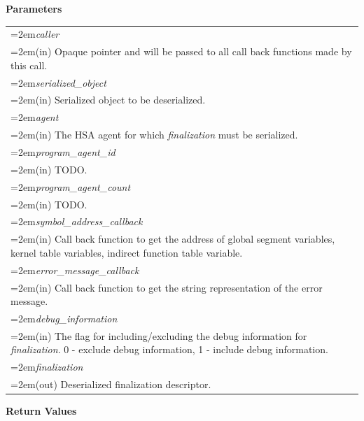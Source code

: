 \documentclass[final]{book}
\newcommand{\hsaarg}[1]{\textit{#1}}
\begin{document}
\noindent\textbf{Parameters}\\[-6mm]
\noindent\begin{longtable}{@{}>{\hangindent=2em}p{\textwidth}}
\hsaarg{caller}\\\hspace{2em}(in) Opaque pointer and will be passed to all call back functions made by this call.\\[2mm]
\hsaarg{serialized_\-object}\\\hspace{2em}(in) Serialized object to be deserialized.\\[2mm]
\hsaarg{agent}\\\hspace{2em}(in) The HSA agent for which \textit{finalization} must be serialized.\\[2mm]
\hsaarg{program_\-agent_\-id}\\\hspace{2em}(in) TODO.\\[2mm]
\hsaarg{program_\-agent_\-count}\\\hspace{2em}(in) TODO.\\[2mm]
\hsaarg{symbol_\-address_\-callback}\\\hspace{2em}(in) Call back function to get the address of global segment variables, kernel table variables, indirect function table variable.\\[2mm]
\hsaarg{error_\-message_\-callback}\\\hspace{2em}(in) Call back function to get the string representation of the error message.\\[2mm]
\hsaarg{debug_\-information}\\\hspace{2em}(in) The flag for including/excluding the debug information for \textit{finalization}. 0 - exclude debug information, 1 - include debug information.\\[2mm]
\hsaarg{finalization}\\\hspace{2em}(out) Deserialized finalization descriptor.
\end{longtable}
\vspace{-5mm}\noindent\textbf{Return Values}\\[-6mm]
\end{document}
